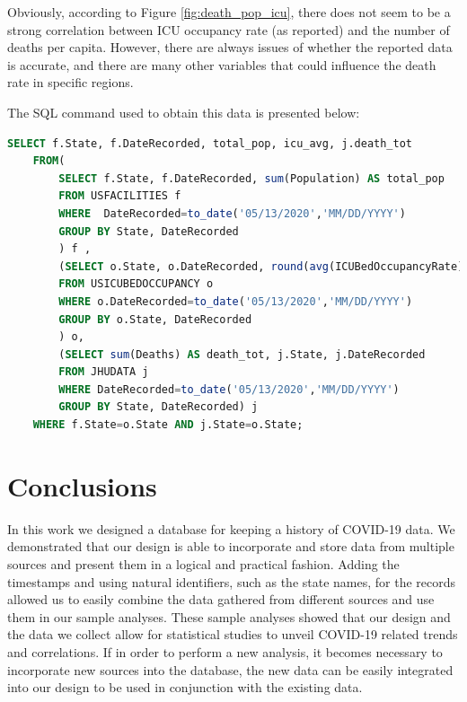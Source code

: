 \documentclass[11pt]{article}
\begin{document}
\noindent
Obviously, according to Figure \ref{fig:death_pop_icu}, there does not seem to be a strong correlation between ICU occupancy rate (as reported) and the number of deaths per capita. However, there are always issues of whether the reported data is accurate, and there are many other variables that could influence the death rate in specific regions.
\pagebreak

\noindent
The SQL command used to obtain this data is presented below:
\begin{lstlisting}[language=SQL,
        deletekeywords={IDENTITY,INT},
        morekeywords={clustered},    
        framesep=10pt,
        framextopmargin=10pt]
    SELECT f.State, f.DateRecorded, total_pop, icu_avg, j.death_tot 
    FROM(
        SELECT f.State, f.DateRecorded, sum(Population) AS total_pop 
        FROM USFACILITIES f 
        WHERE  DateRecorded=to_date('05/13/2020','MM/DD/YYYY')  
        GROUP BY State, DateRecorded
        ) f , 
        (SELECT o.State, o.DateRecorded, round(avg(ICUBedOccupancyRate),3) AS     icu_avg 
        FROM USICUBEDOCCUPANCY o 
        WHERE o.DateRecorded=to_date('05/13/2020','MM/DD/YYYY')  
        GROUP BY o.State, DateRecorded
        ) o, 
        (SELECT sum(Deaths) AS death_tot, j.State, j.DateRecorded 
        FROM JHUDATA j 
        WHERE DateRecorded=to_date('05/13/2020','MM/DD/YYYY')   
        GROUP BY State, DateRecorded) j 
    WHERE f.State=o.State AND j.State=o.State;\end{lstlisting}

\pagebreak

\section{Conclusions}
\label{sec:conclusion}

\noindent
In this work we designed a database for keeping a history of COVID-19 data. We demonstrated that our design is able to incorporate and store data from multiple sources and present them in a logical and practical fashion. Adding the timestamps and using natural identifiers, such as the state names, for the records allowed us to easily combine the data gathered from different sources and use them in our sample analyses. These sample analyses showed that our design and the data we collect allow for statistical studies to unveil COVID-19 related trends and correlations. If in order to perform a new analysis, it becomes necessary to incorporate new sources into the database, the new data can be easily integrated into our design to be used in conjunction with the existing data.\\
\end{document}
